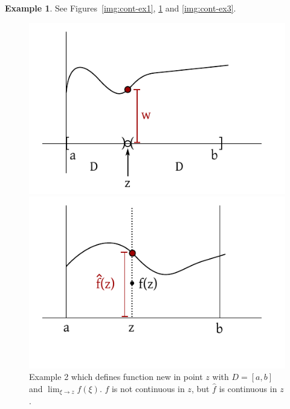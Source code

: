\documentclass[a4paper,landscape,twocolumn]{article}
\theoremstyle{definition}
\newtheorem{ex}{Example}
\newcommand\set[1]{\left\{#1\right\}}
\begin{document}
\begin{ex}
  See Figures~\ref{img:cont-ex1}, \ref{img:cont-ex2} and \ref{img:cont-ex3}.
  \begin{figure}[p]
    \begin{center}
      \includegraphics{img/continuity_example_1.pdf}
      \caption{Example 1 with $D = [a, b] \setminus \set{z}$ and $w = \lim_{\xi \to z} f(\xi)$}
      \label{img:cont-ex1}
    \end{center}
    \begin{center}
      \includegraphics{img/continuity_example_2.pdf}
      \caption{
        Example 2 which defines function new in point $z$ with $D = [a,b]$ and $\lim_{\xi \to z} f(\xi)$.
        $f$ is not continuous in $z$, but $\hat{f}$ is continuous in $z$.
      }
      \label{img:cont-ex2}
    \end{center}
  \end{figure}

\end{ex}
\end{document}

